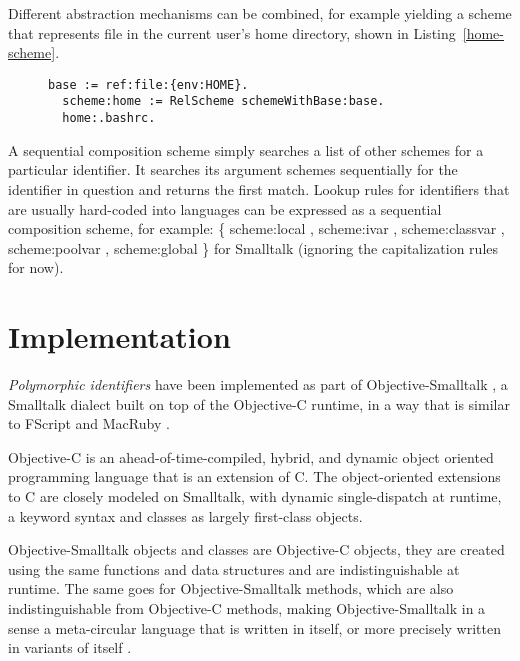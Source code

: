 \documentclass[preprint,authoryear]{acm_proc_article-sp}
\begin{document}
Different abstraction mechanisms can be combined, for example yielding
a scheme that represents file in the current user's home directory, shown
in Listing~\ref{home-scheme}.


\begin{figure}[htbp]
\begin{lstlisting}[style=L,label=home-scheme,caption=Accessing .bashrc via custom home: scheme.]
  base := ref:file:{env:HOME}.
  scheme:home := RelScheme schemeWithBase:base.
  home:.bashrc.
\end{lstlisting}
\end{figure}

A sequential composition scheme simply searches a list of other schemes
for a particular identifier.  It searches its argument schemes sequentially
for the identifier in question and returns the first match.  Lookup rules for
identifiers that are usually hard-coded into languages can be expressed
as a sequential composition scheme, for example:   \{ scheme:local ,
scheme:ivar , scheme:classvar , scheme:poolvar , scheme:global \} for Smalltalk 
(ignoring the capitalization rules for now).




\section{Implementation}
\label{implementation}

\emph{Polymorphic identifiers} have been implemented as part of Objective-Smalltalk \cite{objst},
a Smalltalk dialect built on top of the Objective-C\cite{objc-evol}\cite{objc-apple} runtime, 
in a way that is similar to FScript\cite{fscript} and MacRuby \cite{macruby}.

Objective-C is an ahead-of-time-compiled, hybrid, and dynamic object oriented programming language
that is an extension of C.  The object-oriented extensions to C are closely modeled on
Smalltalk, with dynamic single-dispatch at runtime, a keyword syntax and classes as
largely first-class objects.

Objective-Smalltalk objects and classes are Objective-C objects, they are created using
the same functions and data structures and are indistinguishable at runtime.
The same goes for Objective-Smalltalk methods, which are also indistinguishable from
Objective-C methods, making Objective-Smalltalk in a sense a meta-circular language
that is written in itself, or more precisely written in variants of itself \cite{kleinvm}\cite{squeak}.
\end{document}
